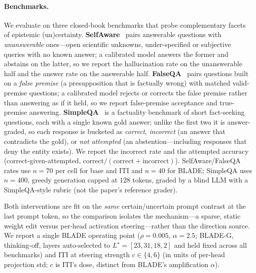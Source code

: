 \paragraph{Benchmarks.} We evaluate on three closed-book benchmarks that probe complementary facets of
epistemic (un)certainty. \textbf{SelfAware}~\cite{selfaware} pairs answerable questions with
\emph{unanswerable} ones---open scientific unknowns, under-specified or subjective queries with no known
answer; a calibrated model answers the former and abstains on the latter, so we report the hallucination
rate on the unanswerable half and the answer rate on the answerable half.
\textbf{FalseQA}~\cite{falseqa} pairs questions built on a \emph{false premise} (a presupposition that is
factually wrong) with matched valid-premise questions; a calibrated model rejects or corrects the false
premise rather than answering as if it held, so we report false-premise acceptance and true-premise
answering. \textbf{SimpleQA}~\cite{simpleqa} is a factuality benchmark of short fact-seeking questions,
each with a single known gold answer; unlike the first two it is answer-graded, so each response is
bucketed as \emph{correct}, \emph{incorrect} (an answer that contradicts the gold), or
\emph{not attempted} (an abstention---including responses that deny the entity exists). We report the
incorrect rate and the attempted accuracy (correct-given-attempted,
$\mathrm{correct}/(\mathrm{correct}+\mathrm{incorrect})$). SelfAware/FalseQA rates use $n\!=\!70$ per
cell for base and ITI and $n\!=\!40$ for BLADE; SimpleQA uses $n\!=\!400$, greedy generation capped at
$128$ tokens, graded by a blind LLM with a SimpleQA-style rubric (not the paper's reference grader).

Both interventions are fit on the \emph{same} certain/uncertain prompt contrast at the last prompt
token, so the comparison isolates the mechanism---a sparse, static weight edit versus per-head
activation steering---rather than the direction source. We report a single BLADE operating point
($\rho\!=\!0.005$, $\alpha\!=\!2.5$; BLADE-G, thinking-off, layers auto-selected to
$L^\star\!=\![23,31,18,2]$ and held fixed across all benchmarks) and ITI at steering strength
$c\!\in\!\{4,6\}$ (in units of per-head projection std; $c$ is ITI's dose, distinct from BLADE's
amplification $\alpha$).

